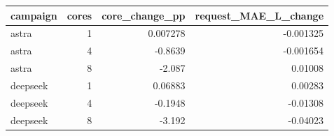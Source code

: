 \begin{tabular}{lrrr}
\toprule
campaign & cores & core\_change\_pp & request\_MAE\_L\_change \\
\midrule
astra & 1 & 0.007278 & -0.001325 \\
astra & 4 & -0.8639 & -0.001654 \\
astra & 8 & -2.087 & 0.01008 \\
deepseek & 1 & 0.06883 & 0.00283 \\
deepseek & 4 & -0.1948 & -0.01308 \\
deepseek & 8 & -3.192 & -0.04023 \\
\bottomrule
\end{tabular}
